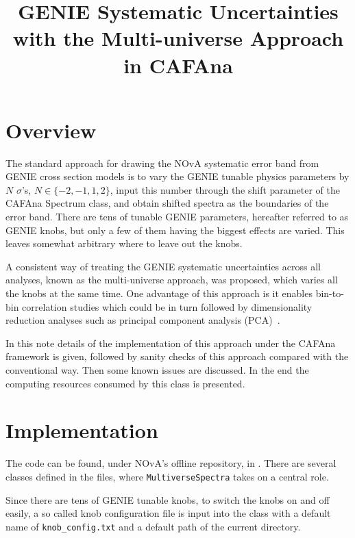 \documentclass[12pt,a4paper,final]{iopart}
\begin{document}
\title{GENIE Systematic Uncertainties with the Multi-universe Approach in CAFAna}

\section{Overview}
The standard approach for drawing the NOvA systematic error band from GENIE cross section models is to vary the GENIE tunable physics parameters by $N$ $\sigma$'s, $N\in\{-2,-1,1,2\}$, input this number through the shift parameter of the CAFAna Spectrum class, and obtain shifted spectra as the boundaries of the error band. There are tens of tunable GENIE parameters, hereafter referred to as GENIE knobs, but only a few of them having the biggest effects are varied. This leaves somewhat arbitrary where to leave out the knobs.

A consistent way of treating the GENIE systematic uncertainties across all analyses, known as the multi-universe approach, was proposed, which varies all the knobs at the same time. One advantage of this approach is it enables bin-to-bin correlation studies which could be in turn followed by dimensionality reduction analyses such as principal component analysis (PCA)~\cite{ref1}.

In this note details of the implementation of this approach under the CAFAna framework is given, followed by sanity checks of this approach compared with the conventional way. Then some known issues are discussed. In the end the computing resources consumed by this class is presented.

\section{Implementation}
The code can be found, under NOvA's offline repository, in . There are several classes defined in the files, where \texttt{MultiverseSpectra} takes on a central role.

Since there are tens of GENIE tunable knobs, to switch the knobs on and off easily, a so called knob configuration file is input into the class with a default name of \texttt{knob\_config.txt} and a default path of the current directory.
\end{document}
